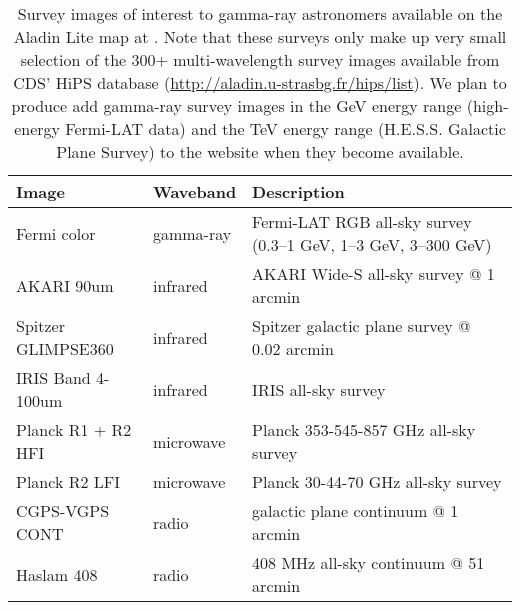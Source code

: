 \begin{table}[bt]

\caption{
Survey images of interest to gamma-ray astronomers available on the Aladin Lite map at \gammasky . Note that these surveys only make up very small selection of the 300+ multi-wavelength survey images available from CDS' HiPS database (\protect\url{http://aladin.u-strasbg.fr/hips/list}). We plan to produce add gamma-ray survey images in the GeV energy range (high-energy Fermi-LAT data) and the TeV energy range (H.E.S.S. Galactic Plane Survey) to the website when they become available.
}

\label{tab:images}
\begin{tabular}{ lll }
\hline
Image              & Waveband  & Description\\
\hline
Fermi color        & gamma-ray & Fermi-LAT RGB all-sky survey (0.3--1 GeV, 1--3 GeV, 3--300 GeV) \\
AKARI 90um         & infrared  & AKARI Wide-S all-sky survey @ 1 arcmin\\
Spitzer GLIMPSE360 & infrared  & Spitzer galactic plane survey @ 0.02 arcmin\\
IRIS Band 4-100um  & infrared  & IRIS all-sky survey\\
Planck R1 + R2 HFI & microwave & Planck 353-545-857 GHz all-sky survey\\
Planck R2 LFI      & microwave & Planck 30-44-70 GHz all-sky survey\\
CGPS-VGPS CONT     & radio     & galactic plane continuum @ 1 arcmin\\
Haslam 408         & radio     & 408 MHz all-sky continuum @ 51 arcmin\\
\hline
\end{tabular}

\end{table}

